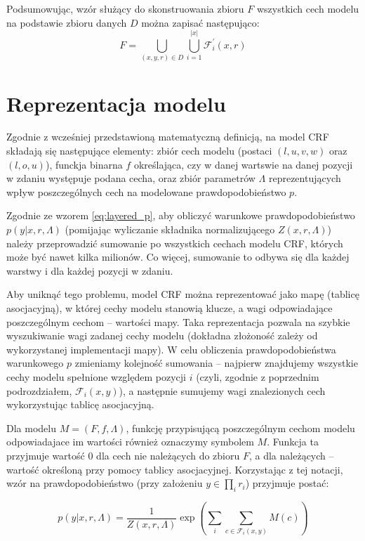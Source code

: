 \documentclass[a4paper,10]{article}
\begin{document}
Podsumowując, wzór służący do skonstruowania zbioru $F$ wszystkich cech
modelu na podstawie zbioru danych $D$ można zapisać następująco:  
\begin{equation}
F = \bigcup_{(x, y, r) \in D} \bigcup_{i=1}^{|x|} \mathcal F^\prime_i(x, r)
\end{equation}

\section{Reprezentacja modelu}\label{sec:model_repr}

Zgodnie z wcześniej przedstawioną matematyczną definicją, na model
CRF składają się następujące elementy: zbiór cech modelu
(postaci $(l, u, v, w)$ oraz $(l, o, u)$),
funckja binarna $f$ określająca, czy w danej wartswie na danej pozycji
w zdaniu występuje podana cecha, oraz zbiór parametrów $\Lambda$ reprezentujących
wpływ poszczególnych cech na modelowane prawdopodobieństwo $p$.

Zgodnie ze wzorem \ref{eq:layered_p}, aby obliczyć warunkowe prawdopodobieństwo
$p(y \vert x, r, \Lambda)$ (pomijając wyliczanie składnika normalizującego
$Z(x, r, \Lambda)$) należy przeprowadzić sumowanie po wszystkich cechach
modelu CRF, których może być nawet kilka milionów.
Co więcej, sumowanie to odbywa się dla każdej warstwy i dla każdej
pozycji w zdaniu.

Aby uniknąć tego problemu, model CRF można reprezentować jako mapę
(tablicę asocjacyjną), w której cechy modelu stanowią klucze,
a wagi odpowiadające poszczególnym cechom -- wartości mapy.
Taka reprezentacja pozwala na szybkie wyszukiwanie
wagi zadanej cechy modelu (dokładna złożoność zależy od wykorzystanej implementacji
mapy). W celu obliczenia prawdopodobieństwa warunkowego $p$ zmieniamy
kolejność sumowania -- najpierw znajdujemy wszystkie cechy modelu
spełnione względem pozycji $i$ (czyli, zgodnie z poprzednim podrozdziałem,
$\mathcal F_i(x, y)$), a następnie sumujemy wagi znalezionych cech
wykorzystując tablicę asocjacyjną.

Dla modelu $M = (F, f, \Lambda)$, funkcję przypisującą poszczególnym
cechom modelu odpowiadajace im wartości również oznaczymy symbolem $M$.
Funkcja ta przyjmuje wartość $0$ dla cech nie należących do zbioru $F$,
a dla należących -- wartość określoną przy pomocy tablicy asocjacyjnej.
Korzystając z tej notacji, wzór na prawdopodobieństwo
(przy założeniu $y \in \prod_i r_i$) przyjmuje postać:

\begin{equation}\label{eq:final_p}
p(y \vert x, r, \Lambda) =
  \frac{1}{Z(x, r, \Lambda)} \exp
   \left(
    \sum_{i} \sum_{c \in \mathcal F_i(x, y)} M(c)
   \right)
\end{equation}
\end{document}
